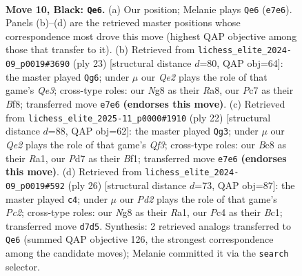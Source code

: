 \documentclass[11pt]{article}
\begin{document}
\clearpage

\begin{figure}[p]\centering
\begin{subfigure}{0.46\textwidth}\centering
\resizebox{\linewidth}{!}{%
\newchessgame
\chessboard[
  setfen={r1b1kbnr/p1ppqppp/8/4P3/2p3PP/2P5/PP2QP2/RNB1KB1R b KQkq - 0 10},
  showmover=false,
  pgfstyle=straightmove, color=movearrow, markmove={e7-e6}
]}
\caption{}
\end{subfigure}\hfill
\begin{subfigure}{0.46\textwidth}\centering
\resizebox{\linewidth}{!}{%
\newchessgame
\chessboard[
  setfen={r3kb1r/2pp1ppp/b1p1q3/p3P3/1nP4P/5NP1/PP2QP2/R1B1KB1R b KQkq - 0 12},
  showmover=false,
  pgfstyle=straightmove, color=movearrow, markmove={e6-g6}
]}
\caption{}
\end{subfigure}
\\[4pt]
\begin{subfigure}{0.46\textwidth}\centering
\resizebox{\linewidth}{!}{%
\newchessgame
\chessboard[
  setfen={r1b1k2r/pp1nqppp/4p3/2p1P3/2P5/P1N2Q2/1P3PPP/R3KB1R w KQkq - 0 12},
  showmover=false,
  pgfstyle=straightmove, color=movearrow, markmove={f3-g3}
]}
\caption{}
\end{subfigure}\hfill
\begin{subfigure}{0.46\textwidth}\centering
\resizebox{\linewidth}{!}{%
\newchessgame
\chessboard[
  setfen={rnb1kb1r/2p1qppp/p7/3n4/Np1Pp3/8/PPP1QPPP/RNB1KB1R w KQkq - 0 14},
  showmover=false,
  pgfstyle=straightmove, color=movearrow, markmove={c2-c4}
]}
\caption{}
\end{subfigure}
\caption{\textbf{Move 10, Black: \texttt{Qe6}.} (a) Our position; Melanie plays \texttt{Qe6} (\texttt{e7e6}). Panels (b)--(d) are the retrieved master positions whose correspondence most drove this move (highest QAP objective among those that transfer to it). (b) Retrieved from \texttt{lichess\_elite\_2024-09\_p0019\#3690} (ply 23) [structural distance $d$=80, QAP obj=64]: the master played \texttt{Qg6}; under $\mu$ our \emph{Qe2} plays the role of that game's \emph{Qe3}; cross-type roles: our \emph{N}g8 as their \emph{R}a8, our \emph{P}c7 as their \emph{B}f8; transferred move \texttt{e7e6} \textbf{(endorses this move)}. (c) Retrieved from \texttt{lichess\_elite\_2025-11\_p0000\#1910} (ply 22) [structural distance $d$=88, QAP obj=62]: the master played \texttt{Qg3}; under $\mu$ our \emph{Qe2} plays the role of that game's \emph{Qf3}; cross-type roles: our \emph{B}c8 as their \emph{R}a1, our \emph{P}d7 as their \emph{B}f1; transferred move \texttt{e7e6} \textbf{(endorses this move)}. (d) Retrieved from \texttt{lichess\_elite\_2024-09\_p0019\#592} (ply 26) [structural distance $d$=73, QAP obj=87]: the master played \texttt{c4}; under $\mu$ our \emph{Pd2} plays the role of that game's \emph{Pc2}; cross-type roles: our \emph{N}g8 as their \emph{R}a1, our \emph{P}c4 as their \emph{B}c1; transferred move \texttt{d7d5}. Synthesis: 2 retrieved analogs transferred to \texttt{Qe6} (summed QAP objective 126, the strongest correspondence among the candidate moves); Melanie committed it via the \texttt{search} selector.}
\label{fig:thought-m19}
\end{figure}
\end{document}
